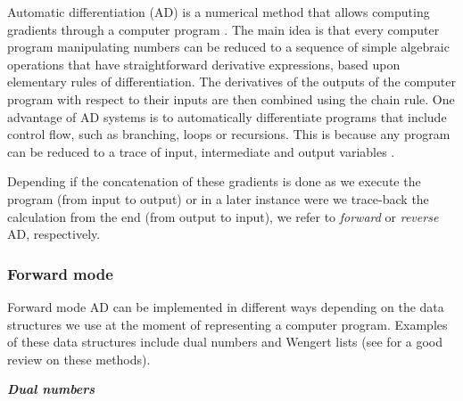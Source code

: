 Automatic differentiation (AD) is a numerical method that allows computing gradients through a computer program \cite{griewank2008evaluatingderivatives}. 
The main idea is that every computer program manipulating numbers can be reduced to a sequence of simple algebraic operations that have straightforward derivative expressions, based upon elementary rules of differentiation.
The derivatives of the outputs of the computer program with respect to their inputs are then combined using the chain rule.
One advantage of AD systems is to automatically differentiate programs that include control flow, such as branching, loops or recursions. 
This is because any program can be reduced to a trace of input, intermediate and output variables \cite{Baydin_Pearlmutter_Radul_Siskind_2015}.

Depending if the concatenation of these gradients is done as we execute the program (from input to output) or in a later instance were we trace-back the calculation from the end (from output to input), we refer to \textit{forward} or \textit{reverse} AD, respectively.

\subsubsection{Forward mode}

Forward mode AD can be implemented in different ways depending on the data structures we use at the moment of representing a computer program. Examples of these data structures include dual numbers and Wengert lists (see \cite{Baydin_Pearlmutter_Radul_Siskind_2015} for a good review on these methods). 

\vspace*{10px}
\noindent \textbf{\textit{Dual numbers}}
\vspace*{5px}

